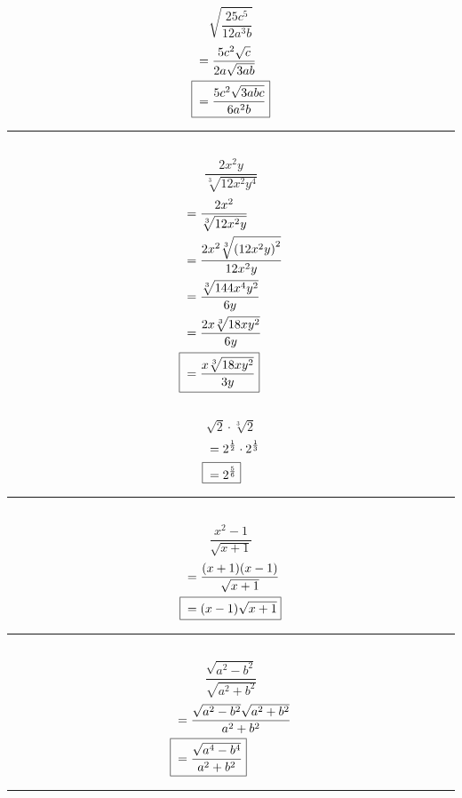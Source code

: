 	\subsection{}
		\[\sqrt{\frac{25c^5}{12a^3b}}\]
		\begin{align*}
			&= \frac{5c^2\sqrt{c}}{2a\sqrt{3ab}} \\
			\Aboxed{{} &= \frac{5c^2\sqrt{3abc}}{6a^2b}}
		\end{align*}
		\hrule{}

	\subsection{}
		\[\frac{2x^2y}{\sqrt[3]{12x^2y^4}}\]
		\begin{align*}
			&= \frac{2x^2}{\sqrt[3]{12x^2y}} \\
			&= \frac{2x^2\sqrt[3]{{(12x^2y)}^2}}{12x^2y} \\
			&= \frac{\sqrt[3]{144x^4y^2}}{6y} \\
			&= \frac{2x\sqrt[3]{18xy^2}}{6y} \\
			\Aboxed{{} &= \frac{x\sqrt[3]{18xy^2}}{3y}}
		\end{align*}

	\subsection{}
		\[\sqrt{2} \cdot \sqrt[3]{2}\]
		\begin{align*}
			&= 2^{\frac{1}{2}} \cdot 2^{\frac{1}{3}} \\
			\Aboxed{{} &= 2^{\frac{5}{6}}}
		\end{align*}
		\hrule{}

	\subsection{}
		\[\frac{x^2 - 1}{\sqrt{x + 1}}\]
		\begin{align*}
			&= \frac{(x + 1)(x - 1)}{\sqrt{x + 1}} \\
			\Aboxed{{} &= (x - 1)\sqrt{x + 1}}
		\end{align*}
		\hrule{}

	\subsection{}
		\[\frac{\sqrt{a^2 - b^2}}{\sqrt{a^2 + b^2}}\]
		\begin{align*}
			&= \frac{\sqrt{a^2 - b^2}\sqrt{a^2 + b^2}}{a^2 + b^2} \\
			\Aboxed{{} &= \frac{\sqrt{a^4 - b^4}}{a^2 + b^2}}
		\end{align*}
		\hrule{}

